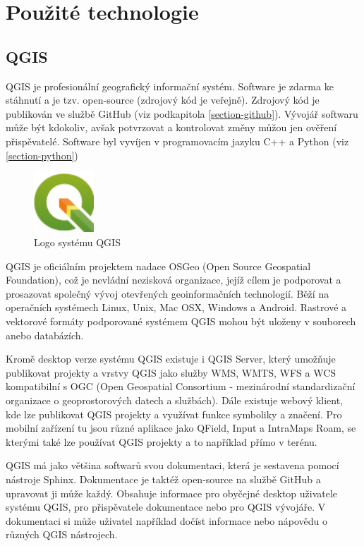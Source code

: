 \chapter{Použité technologie}
\label{4-technologie}

\section{QGIS}

QGIS je profesionální geografický informační systém.
Software je zdarma ke stáhnutí a je tzv. open-source (zdrojový kód je veřejně).
Zdrojový kód je publikován ve službě GitHub (viz podkapitola \ref{section-github}).
Vývojář softwaru může být kdokoliv, avšak potvrzovat a kontrolovat změny můžou jen ověření
přispěvatelé. Software byl vyvíjen v programovacím jazyku C++ a Python (viz \ref{section-python})

\begin{figure}[H] \centering
    \includegraphics[width=64pt]{./pictures/qgis-logo.png}
    \caption[Logo systému QGIS]{Logo systému QGIS \cite{qgis}}
	\label{fig:qgis-logo}                                
\end{figure}

QGIS je oficiálním projektem nadace OSGeo (Open Source Geospatial Foundation), což je nevládní 
nezisková organizace, jejíž cílem je podporovat a prosazovat společný vývoj otevřených geoinformačních
technologií. Běží na operačních systémech Linux, Unix, Mac OSX, Windows a Android.
Rastrové a vektorové formáty podporované systémem QGIS mohou být uloženy v souborech anebo databázích.


Kromě desktop verze systému QGIS existuje i QGIS Server, který umožňuje publikovat projekty a vrstvy
QGIS jako služby WMS, WMTS, WFS a WCS kompatibilní s OGC (Open Geospatial Consortium - mezinárodní standardizační organizace
o geoprostorových datech a službách). Dále existuje webový klient, kde lze publikovat
QGIS projekty a využívat funkce symboliky a značení. Pro mobilní zařízení tu jsou
různé aplikace jako QField, Input a IntraMaps Roam, se kterými také lze používat QGIS projekty a to 
například přímo v terénu. 


QGIS má jako většina softwarů svou dokumentaci, která je sestavena pomocí nástroje Sphinx. 
Dokumentace je taktéž open-source na službě GitHub a upravovat ji může každý. Obsahuje
informace pro obyčejné desktop uživatele systému QGIS, pro přispěvatele dokumentace nebo pro QGIS
vývojáře. V dokumentaci si může uživatel například dočíst informace nebo nápovědu o různých
QGIS nástrojech.


